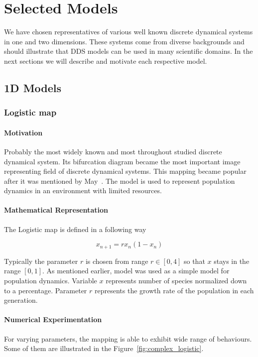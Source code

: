 \chapter{Selected Models}
We have chosen representatives of various well known discrete dynamical systems in one and two dimensions. These systems come from diverse backgrounds and should illustrate that DDS models can be used in many scientific domains. In the next sections we will describe and motivate each respective model.

\section{1D Models}

\subsection{Logistic map}
\label{subsec:Logistic map}

\subsubsection{Motivation}
Probably the most widely known and most throughout studied discrete dynamical system.
Its bifurcation diagram became the most important image representing field of discrete dynamical systems.
This mapping became popular after it was mentioned by May~\cite{May19760610}.
The model is used to represent population dynamics in an environment with limited resources.

\subsubsection{Mathematical Representation}
The Logistic map is defined in a following way

\begin{equation}
    x_{n+1} = r x_{n} ( 1 - x_{n} )
\end{equation}

Typically the parameter $r$ is chosen from range $r \in [0, 4]$ so that $x$ stays in the range $[0,1]$.
As mentioned earlier, model was used as a simple model for population dynamics.
Variable $x$ represents number of species normalized down to a percentage.
Parameter $r$ represents the growth rate of the population in each generation.

\subsubsection{Numerical Experimentation}
For varying parameters, the mapping is able to exhibit wide range of behaviours.
Some of them are illustrated in the Figure~\ref{fig:complex_logistic}.

